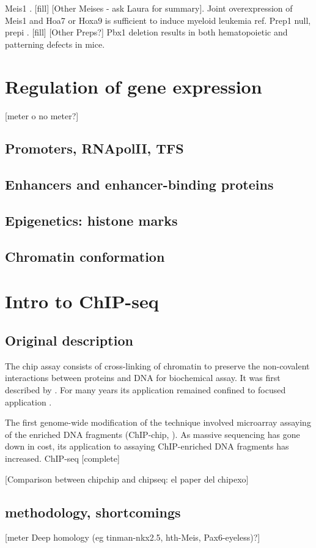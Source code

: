 		Meis1  \cite{Azcoitia2005, Carramolino2010}. [fill] [Other Meises - ask Laura for summary]. Joint overexpression of Meis1 and Hoa7 or Hoxa9 is sufficient to induce myeloid leukemia {ref}.
		Prep1 null, \ac{prepi} \cite{Ferretti2006, Fernandez-Diaz2010, Longobardi2010}. [fill] [Other Preps?]
		Pbx1 deletion results in both hematopoietic \cite{DiMartino2001} and patterning \cite{Selleri et al. 2001} defects in mice.

\section{Regulation of gene expression}
[meter o no meter?]
\subsection{Promoters, RNApolII, TFS}

\subsection{Enhancers and enhancer-binding proteins}

\subsection{Epigenetics: histone marks}

\subsection{Chromatin conformation}

\section{Intro to ChIP-seq}

\subsection{Original description}
The \ac{chip} assay consists of cross-linking of chromatin to preserve the non-covalent interactions between proteins and DNA for biochemical assay. It was first described by \cite{Solomon1988}. For many years its application remained confined to focused application \cite{Mardis2007}.  

The first genome-wide modification of the technique involved microarray assaying of the enriched DNA fragments (ChIP-chip, \cite{Ren2000}). As massive sequencing has gone down in cost, its application to assaying ChIP-enriched DNA fragments has increased. ChIP-seq \cite{Robertson2007} [complete]

[Comparison between chipchip and chipseq: el paper del chipexo]

\subsection{methodology, shortcomings}




[meter Deep homology (eg tinman-nkx2.5, hth-Meis, Pax6-eyeless)?]
